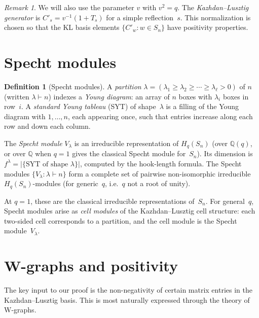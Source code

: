 \documentclass[11pt]{article}
\theoremstyle{definition}
\newtheorem{definition}[theorem]{Definition}
\theoremstyle{remark}
\newtheorem{remark}[theorem]{Remark}
\begin{document}
\begin{remark}
We will also use the parameter $v$ with $v^2 = q$.
The \emph{Kazhdan--Lusztig generator} is $C'_s = v^{-1}(1 + T_s)$
for a simple reflection~$s$.
This normalization is chosen so that the KL basis elements
$\{C'_w : w \in S_n\}$ have positivity properties.
\end{remark}

\section{Specht modules}\label{sec:specht}

\begin{definition}[Specht modules]
A \emph{partition} $\lambda = (\lambda_1 \geq \lambda_2 \geq \cdots
\geq \lambda_\ell > 0)$ of $n$ (written $\lambda \vdash n$)
indexes a \emph{Young diagram}: an array of $n$ boxes with
$\lambda_i$ boxes in row~$i$.
A \emph{standard Young tableau} (SYT) of shape~$\lambda$ is a
filling of the Young diagram with $1, \ldots, n$, each appearing once,
such that entries increase along each row and down each column.

The \emph{Specht module} $V_\lambda$ is an irreducible representation
of $H_q(S_n)$ (over $\mathbb{Q}(q)$, or over $\mathbb{Q}$ when $q = 1$
gives the classical Specht module for~$S_n$).
Its dimension is $f^\lambda = |\{\text{SYT of shape } \lambda\}|$,
computed by the hook-length formula.
The Specht modules $\{V_\lambda : \lambda \vdash n\}$ form a complete
set of pairwise non-isomorphic irreducible $H_q(S_n)$-modules
(for generic~$q$, i.e.\ $q$ not a root of unity).
\end{definition}

At $q = 1$, these are the classical irreducible representations of~$S_n$.
For general~$q$, Specht modules arise as \emph{cell modules} of the
Kazhdan--Lusztig cell structure: each two-sided cell corresponds to a
partition, and the cell module is the Specht module~$V_\lambda$.

\section{W-graphs and positivity}\label{sec:wgraph}

The key input to our proof is the non-negativity of certain matrix
entries in the Kazhdan--Lusztig basis.
This is most naturally expressed through the theory of W-graphs.
\end{document}
